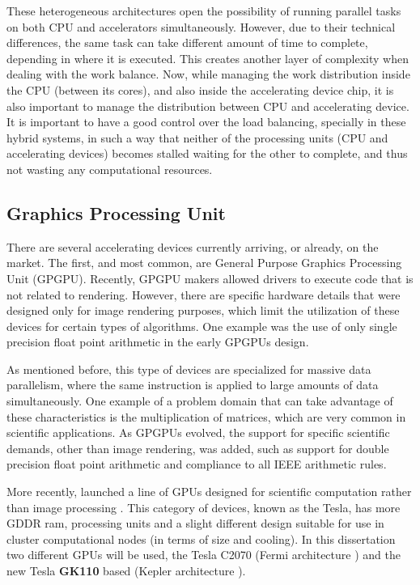 These heterogeneous architectures open the possibility of running parallel tasks on both CPU and accelerators simultaneously. However, due to their technical differences, the same task can take different amount of time to complete, depending in where it is executed. This creates another layer of complexity when dealing with the work balance. Now, while managing the work distribution inside the CPU (between its cores), and also inside the accelerating device chip, it is also important to manage the distribution between CPU and accelerating device. It is important to have a good control over the load balancing, specially in these hybrid systems, in such a way that neither of the processing units (CPU and accelerating devices) becomes stalled waiting for the other to complete, and thus not wasting any computational resources.

\subsection{Graphics Processing Unit}

There are several accelerating devices currently arriving, or already, on the market. The first, and most common, are General Purpose Graphics Processing Unit (GPGPU). Recently, GPGPU makers allowed drivers to execute code that is not related to rendering. However, there are specific hardware details that were designed only for image rendering purposes, which limit the utilization of these devices for certain types of algorithms. One example was the use of only single precision float point arithmetic in the early GPGPUs design.

As mentioned before, this type of devices are specialized for massive data parallelism, where the same instruction is applied to large amounts of data simultaneously. One example of a problem domain that can take advantage of these characteristics is the multiplication of matrices, which are very common in scientific applications. As GPGPUs evolved, the support for specific scientific demands, other than image rendering, was added, such as support for double precision float point arithmetic and compliance to all IEEE arithmetic rules.

More recently, \nvidia \cite{NVIDIA} launched a line of GPUs designed for scientific computation rather than image processing \cite{NVIDIA:Tesla}. This category of devices, known as the Tesla, has more GDDR ram, processing units and a slight different design suitable for use in cluster computational nodes (in terms of size and cooling). In this dissertation two different \nvidia GPUs will be used, the \nvidia Tesla C2070 (Fermi architecture \cite{NVIDIA:Fermi}) and the new \nvidia Tesla \textbf{GK110} based (Kepler architecture \cite{NVIDIA:Kepler}).

